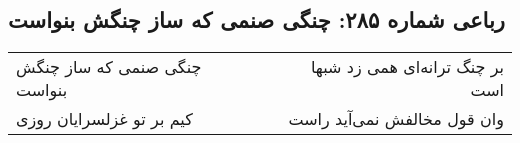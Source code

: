 \begin{center}
\section*{رباعی شماره ۲۸۵: چنگی صنمی که ساز چنگش بنواست}
\label{sec:0285}
\begin{longtable}{l p{0.5cm} r}
چنگی صنمی که ساز چنگش بنواست
&&
بر چنگ ترانه‌ای همی زد شبها است
\\
کیم بر تو غزلسرایان روزی
&&
وان قول مخالفش نمی‌آید راست
\\
\end{longtable}
\end{center}
